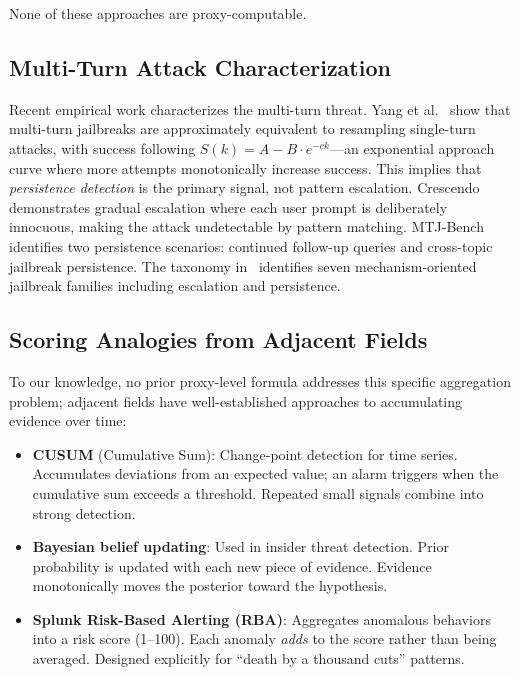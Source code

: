 \documentclass[11pt,a4paper]{article}
\begin{document}
None of these approaches are proxy-computable.

\subsection{Multi-Turn Attack Characterization}

Recent empirical work characterizes the multi-turn threat. Yang et
al.~\cite{yangsimpler} show that multi-turn jailbreaks are approximately
equivalent to resampling single-turn attacks, with success following
$S(k) = A - B \cdot e^{-ck}$---an exponential approach curve where more
attempts monotonically increase success. This implies that
\emph{persistence detection} is the primary signal, not pattern
escalation. Crescendo~\cite{crescendo} demonstrates gradual escalation
where each user prompt is deliberately innocuous, making the attack
undetectable by pattern matching. MTJ-Bench~\cite{mtjbench} identifies
two persistence scenarios: continued follow-up queries and cross-topic
jailbreak persistence. The taxonomy in~\cite{guardingguardrails}
identifies seven mechanism-oriented jailbreak families including
escalation and persistence.

\subsection{Scoring Analogies from Adjacent Fields}
\label{sec:analogies}

To our knowledge, no prior proxy-level formula addresses this specific
aggregation problem; adjacent
fields have well-established approaches to accumulating evidence over
time:

\begin{itemize}[nosep]
  \item \textbf{CUSUM} (Cumulative Sum): Change-point detection for time
    series. Accumulates deviations from an expected value; an alarm
    triggers when the cumulative sum exceeds a threshold. Repeated small
    signals combine into strong detection.
  \item \textbf{Bayesian belief updating}: Used in insider threat
    detection. Prior probability is updated with each new piece of
    evidence. Evidence monotonically moves the posterior toward the
    hypothesis.
  \item \textbf{Splunk Risk-Based Alerting (RBA)}: Aggregates anomalous
    behaviors into a risk score (1--100). Each anomaly \emph{adds} to
    the score rather than being averaged. Designed explicitly for
    ``death by a thousand cuts'' patterns.
\end{itemize}
\end{document}
